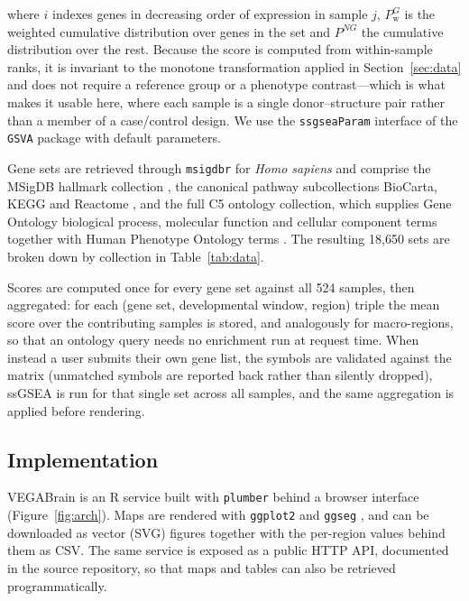 \documentclass[pdflatex,sn-basic]{sn-jnl}
\begin{document}
where $i$ indexes genes in decreasing order of expression in sample $j$,
$P^{G}_{\mathrm{w}}$ is the weighted cumulative distribution over genes in the
set and $P^{NG}$ the cumulative distribution over the rest. Because the score is
computed from within-sample ranks, it is invariant to the monotone
transformation applied in Section~\ref{sec:data} and does not require a
reference group or a phenotype contrast---which is what makes it usable here,
where each sample is a single donor--structure pair rather than a member of a
case/control design. We use the \texttt{ssgseaParam} interface of the
\texttt{GSVA} package \citep{Hanzelmann2013} with default parameters.

Gene sets are retrieved through \texttt{msigdbr} \citep{Dolgalev2025msigdbr} for
\emph{Homo sapiens} and comprise the MSigDB hallmark collection
\citep{Liberzon2015}, the canonical pathway subcollections BioCarta, KEGG
\citep{Kanehisa2000} and Reactome \citep{Gillespie2022}, and the full C5
ontology collection, which supplies Gene Ontology biological process, molecular
function and cellular component terms \citep{Ashburner2000,GOConsortium2023}
together with Human Phenotype Ontology terms \citep{Kohler2021}. The resulting
18{,}650 sets are broken down by collection in Table~\ref{tab:data}.

Scores are computed once for every gene set against all 524 samples, then
aggregated: for each (gene set, developmental window, region) triple the mean
score over the contributing samples is stored, and analogously for macro-regions,
so that an ontology query needs no enrichment run at request time. When instead a user submits their own gene list, the symbols are validated
against the matrix (unmatched symbols are reported back rather than silently
dropped), ssGSEA is run for that single set across all samples, and the same
aggregation is applied before rendering.

\subsection{Implementation}\label{sec:impl}

VEGABrain is an R \citep{RCoreTeam2026} service built with \texttt{plumber}
\citep{Schloerke2024plumber} behind a browser interface (Figure~\ref{fig:arch}).
Maps are rendered with \texttt{ggplot2} and \texttt{ggseg}
\citep{Mowinckel2020}, and can be downloaded as vector (SVG) figures together
with the per-region values behind them as CSV. The same service is exposed as a
public HTTP API, documented in the source repository, so that maps and tables
can also be retrieved programmatically.
\end{document}
